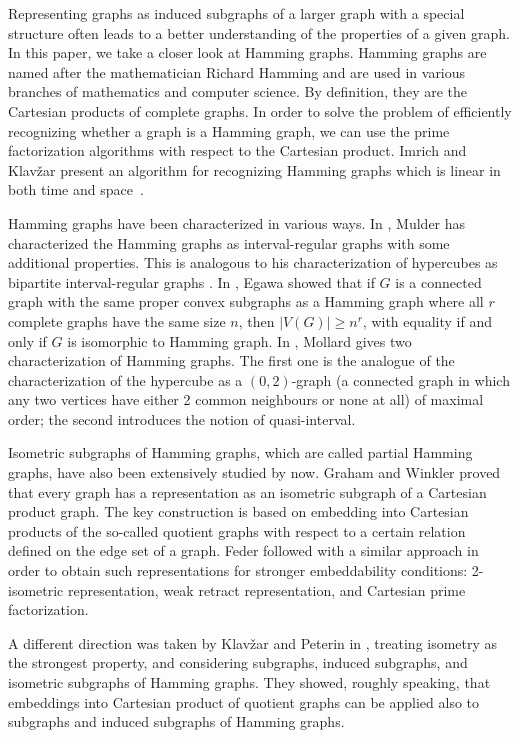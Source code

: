 \documentclass[12pt,a4paper,titlepage,openany]{report}
\begin{document}
Representing graphs as induced subgraphs of a larger graph with a special structure often leads to a better understanding of the properties of a given graph. In this paper, we take a closer look at Hamming graphs. Hamming graphs are named after the mathematician Richard Hamming and are used in various branches of mathematics and computer science. By definition, they are the Cartesian products of complete graphs. In order to solve the problem of efficiently recognizing whether a graph is a Hamming graph, we can use the prime factorization algorithms with respect to the Cartesian product. Imrich and Klav\v zar present an algorithm for recognizing Hamming graphs which is linear in both time and space~\cite{Imrich}.

Hamming graphs have been characterized in various ways. In \cite{Mulder}, Mulder has characterized the Hamming graphs as interval-regular graphs with some additional properties. This is analogous to his characterization of hypercubes as bipartite interval-regular graphs \cite{Mulder}. In \cite{Egawa}, Egawa showed that if $G$ is a connected graph with the same proper convex subgraphs as a Hamming graph where all $r$ complete graphs have the same size $n$, then $|V(G)|\geq n^r$, with equality if and only if $G$ is isomorphic to Hamming graph. In \cite{Mollard}, Mollard gives two characterization of Hamming graphs. The first one is the analogue of the characterization of the hypercube as a $(0,2)$-graph (a connected graph in which any two vertices have either 2 common neighbours or none at all) of maximal order; the second introduces the notion of quasi-interval.

Isometric subgraphs of Hamming graphs, which are called partial Hamming graphs, have also been extensively studied by now.
Graham and Winkler \cite{Graham} proved that every graph has a representation as an isometric subgraph of a Cartesian product graph. The key construction is based on embedding into Cartesian products of the so-called quotient graphs with respect to a certain relation defined on the edge set of a graph. Feder \cite{Feder} followed with a similar approach in order to obtain such representations for stronger embeddability conditions: 2-isometric representation, weak retract representation, and Cartesian prime factorization.

A different direction was taken by Klav\v zar and Peterin in \cite{Iztok}, treating isometry as the strongest property, and considering subgraphs, induced subgraphs, and isometric subgraphs of Hamming graphs. They showed, roughly speaking, that embeddings into Cartesian product of quotient graphs can be applied also to subgraphs and induced subgraphs of Hamming graphs.
\end{document}
